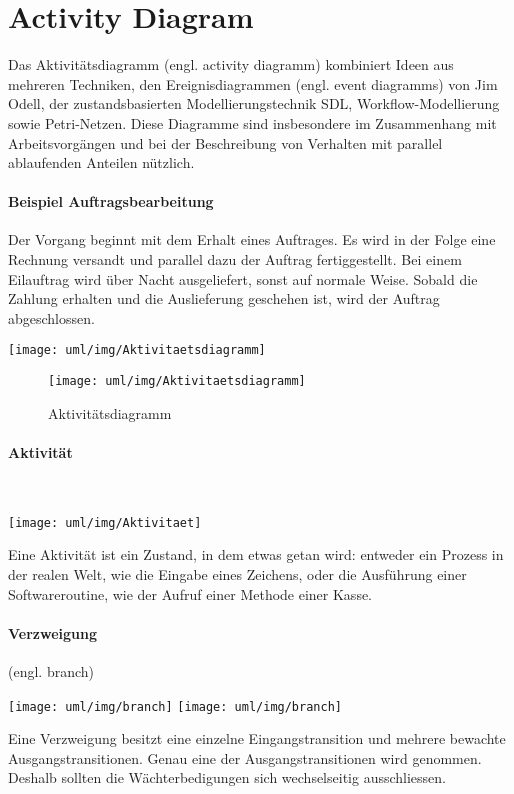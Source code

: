 \begin{minipage}[c]{0.45\linewidth}
\section{Activity Diagram}
Das Aktivit\"atsdiagramm (engl. activity diagramm) kombiniert Ideen aus
mehreren Techniken, den
Ereignisdiagrammen (engl. event diagramms) von Jim Odell, der zustandsbasierten
Modellierungstechnik SDL, Workflow-Modellierung sowie Petri-Netzen. Diese
Diagramme sind
insbesondere im Zusammenhang mit Arbeitsvorg\"angen und bei der Beschreibung
von Verhalten mit
parallel ablaufenden Anteilen n\"utzlich.
\paragraph{Beispiel Auftragsbearbeitung}
Der Vorgang beginnt mit dem Erhalt eines Auftrages.
Es wird in der Folge eine Rechnung versandt und
parallel dazu der Auftrag
fertiggestellt. Bei einem Eilauftrag wird \"uber Nacht ausgeliefert,
sonst auf normale Weise.
Sobald die Zahlung erhalten und die Auslieferung geschehen ist,
wird der Auftrag abgeschlossen.
\ifslides
\begin{center}
\texttt{[image: uml/img/Aktivitaetsdiagramm]}
\end{center}
\else
\begin{figure}[H]
\begin{center}
\texttt{[image: uml/img/Aktivitaetsdiagramm]}
\caption{Aktivitätsdiagramm}
\end{center}
\end{figure}
\fi
%
\newpage
\paragraph{Aktivit\"at}\ \\[2ex]
\begin{minipage}[c]{0.28\linewidth}
\texttt{[image: uml/img/Aktivitaet]}
\end{minipage}
\begin{minipage}[c]{0.7\linewidth}
Eine Aktivit\"at ist ein Zustand, in dem etwas getan wird: entweder ein
Prozess in der realen Welt, wie die Eingabe eines Zeichens, oder die Ausf\"uhrung
einer Softwareroutine, wie der Aufruf einer Methode einer Kasse.
\end{minipage}
%
\paragraph{Verzweigung} (engl. branch)\\[2ex]
\begin{minipage}[c]{0.49\linewidth}
\ifslides
\texttt{[image: uml/img/branch]}
\else
\texttt{[image: uml/img/branch]}
\fi
\end{minipage}
\begin{minipage}[c]{0.5\linewidth}
Eine Verzweigung besitzt eine einzelne Eingangstransition
und mehrere bewachte Ausgangstransitionen. Genau eine der
Ausgangstransitionen wird genommen. Deshalb sollten die
W\"achterbedigungen sich wechselseitig ausschliessen.
\end{minipage}
%
\newslide

\end{minipage}
